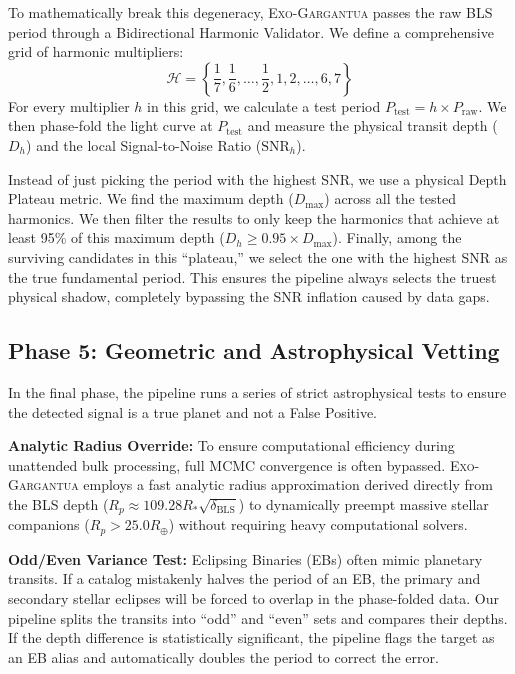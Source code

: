 \documentclass[twocolumn,linenumbers]{aastex701}
\begin{document}
To mathematically break this degeneracy, \textsc{Exo-Gargantua} passes the raw BLS period through a Bidirectional Harmonic Validator. We define a comprehensive grid of harmonic multipliers:
\begin{equation}
    \mathcal{H} = \left\{ \frac{1}{7}, \frac{1}{6}, \dots, \frac{1}{2}, 1, 2, \dots, 6, 7 \right\}
\end{equation}
For every multiplier $h$ in this grid, we calculate a test period $P_{\text{test}} = h \times P_{\text{raw}}$. We then phase-fold the light curve at $P_{\text{test}}$ and measure the physical transit depth ($D_h$) and the local Signal-to-Noise Ratio ($\text{SNR}_h$). 

Instead of just picking the period with the highest SNR, we use a physical Depth Plateau metric. We find the maximum depth ($D_{\text{max}}$) across all the tested harmonics. We then filter the results to only keep the harmonics that achieve at least 95\% of this maximum depth ($D_h \ge 0.95 \times D_{\text{max}}$). Finally, among the surviving candidates in this ``plateau,'' we select the one with the highest SNR as the true fundamental period. This ensures the pipeline always selects the truest physical shadow, completely bypassing the SNR inflation caused by data gaps.

\subsection{Phase 5: Geometric and Astrophysical Vetting}
In the final phase, the pipeline runs a series of strict astrophysical tests to ensure the detected signal is a true planet and not a False Positive. 

\textbf{Analytic Radius Override:} To ensure computational efficiency during unattended bulk processing, full MCMC convergence is often bypassed. \textsc{Exo-Gargantua} employs a fast analytic radius approximation derived directly from the BLS depth ($R_p \approx 109.28 R_* \sqrt{\delta_{\text{BLS}}}$) to dynamically preempt massive stellar companions ($R_p > 25.0 R_\oplus$) without requiring heavy computational solvers.

\textbf{Odd/Even Variance Test:} Eclipsing Binaries (EBs) often mimic planetary transits. If a catalog mistakenly halves the period of an EB, the primary and secondary stellar eclipses will be forced to overlap in the phase-folded data. Our pipeline splits the transits into ``odd'' and ``even'' sets and compares their depths. If the depth difference is statistically significant, the pipeline flags the target as an EB alias and automatically doubles the period to correct the error.
\end{document}
